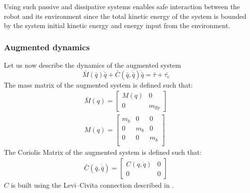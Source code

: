 Using such passive and dissipative systems enables safe interaction between the robot and its environment since the total kinetic energy of the system is bounded by the system initial kinetic energy and energy input from the environment.

\subsubsection{Augmented dynamics}
Let us now describe the dynamics of the augmented system
\begin{equation} 
    \bar{M}(\bar{q})\ddot{\bar{q}} + \bar{C}(\bar{q}, \dot{\bar{q}})\dot{\bar{q}} = \bar{\tau} + \bar{\tau_{e}}
\end{equation}
The mass matrix of the augmented system is defined such that:
\begin{align}
\bar{M}(q) = \begin{bmatrix} 
   M(q) & 0 \\
    0 & m_{\text{fly}}
\end{bmatrix}\\
M(q) =  \begin{bmatrix} 
    m_b & 0 & 0 \\
    0 & m_b & 0 \\
    0 & 0 & m_b \\
 \end{bmatrix}
\end{align}
The Coriolis Matrix of the augmented system is defined such that: 
\begin{align}
\bar{C}(\bar{q}, \dot{\bar{q}}) = \begin{bmatrix} 
    C(q, \dot{q}) & 0 \\
    0 & 0 
\end{bmatrix}
\end{align}
$C$ is built using the Levi–Civita connection described in \cite{li2001passive}.
